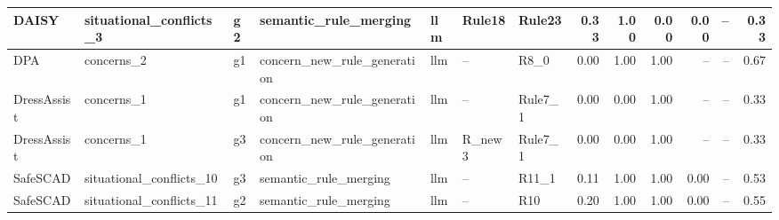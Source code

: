 \begin{table}[t]
{\begin{tabular}{lllllllrrrrrr}
DAISY & situational\_conflicts\_3 & g2 & semantic\_rule\_merging & llm & Rule18 & Rule23 & 0.33 & 1.00 & 0.00 & 0.00 & -- & 0.33 \\
\midrule
DPA & concerns\_2 & g1 & concern\_new\_rule\_generation & llm & -- & R8\_0 & 0.00 & 1.00 & 1.00 & -- & -- & 0.67 \\
\midrule
DressAssist & concerns\_1 & g1 & concern\_new\_rule\_generation & llm & -- & Rule7\_1 & 0.00 & 0.00 & 1.00 & -- & -- & 0.33 \\
DressAssist & concerns\_1 & g3 & concern\_new\_rule\_generation & llm & R\_new3 & Rule7\_1 & 0.00 & 0.00 & 1.00 & -- & -- & 0.33 \\
\midrule
SafeSCAD & situational\_conflicts\_10 & g3 & semantic\_rule\_merging & llm & -- & R11\_1 & 0.11 & 1.00 & 1.00 & 0.00 & -- & 0.53 \\
SafeSCAD & situational\_conflicts\_11 & g2 & semantic\_rule\_merging & llm & -- & R10 & 0.20 & 1.00 & 1.00 & 0.00 & -- & 0.55 \\
\bottomrule
\end{tabular}%
}
\end{table}

